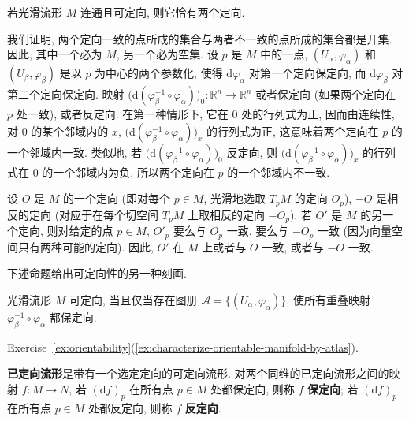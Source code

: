 \begin{RiemannProposition}\label{prop:two-orientations-on-connected-manifold}
若光滑流形 $M$ 连通且可定向, 则它恰有两个定向.
\end{RiemannProposition}

\begin{RiemannProof}
我们证明, 两个定向一致的点所成的集合与两者不一致的点所成的集合都是开集. 因此, 其中一个必为 $M$, 另一个必为空集. 设 $p$ 是 $M$ 中的一点, $(U_\alpha,\varphi_\alpha)$ 和 $(U_\beta,\varphi_\beta)$ 是以 $p$ 为中心的两个参数化, 使得 $\mathrm{d}\varphi_\alpha$ 对第一个定向保定向, 而 $\mathrm{d}\varphi_\beta$ 对第二个定向保定向. 映射 $\bigl(\mathrm{d}(\varphi_\beta^{-1}\circ\varphi_\alpha)\bigr)_0:\mathbb{R}^n\to\mathbb{R}^n$ 或者保定向 (如果两个定向在 $p$ 处一致), 或者反定向. 在第一种情形下, 它在 $0$ 处的行列式为正, 因而由连续性, 对 $0$ 的某个邻域内的 $x$, $\bigl(\mathrm{d}(\varphi_\beta^{-1}\circ\varphi_\alpha)\bigr)_x$ 的行列式为正, 这意味着两个定向在 $p$ 的一个邻域内一致. 类似地, 若 $\bigl(\mathrm{d}(\varphi_\beta^{-1}\circ\varphi_\alpha)\bigr)_0$ 反定向, 则 $\bigl(\mathrm{d}(\varphi_\beta^{-1}\circ\varphi_\alpha)\bigr)_x$ 的行列式在 $0$ 的一个邻域内为负, 所以两个定向在 $p$ 的一个邻域内不一致.

设 $O$ 是 $M$ 的一个定向 (即对每个 $p\in M$, 光滑地选取 $T_pM$ 的定向 $O_p$), $-O$ 是相反的定向 (对应于在每个切空间 $T_pM$ 上取相反的定向 $-O_p$). 若 $O'$ 是 $M$ 的另一个定向, 则对给定的点 $p\in M$, $O'_p$ 要么与 $O_p$ 一致, 要么与 $-O_p$ 一致 (因为向量空间只有两种可能的定向). 因此, $O'$ 在 $M$ 上或者与 $O$ 一致, 或者与 $-O$ 一致.
\end{RiemannProof}

下述命题给出可定向性的另一种刻画.

\begin{RiemannProposition}\label{prop:orientation-preserving-atlas}
光滑流形 $M$ 可定向, 当且仅当存在图册 $\mathcal{A}=\{(U_\alpha,\varphi_\alpha)\}$, 使所有重叠映射 $\varphi_\beta^{-1}\circ\varphi_\alpha$ 都保定向.
\end{RiemannProposition}

\begin{RiemannProof}
Exercise~\ref{ex:orientability}(\ref{ex:characterize-orientable-manifold-by-atlas}).
\end{RiemannProof}

\textbf{已定向流形}是带有一个选定定向的可定向流形. 对两个同维的已定向流形之间的映射 $f:M\to N$, 若 $(\mathrm{d}f)_p$ 在所有点 $p\in M$ 处都保定向, 则称 $f$ \textbf{保定向}; 若 $(\mathrm{d}f)_p$ 在所有点 $p\in M$ 处都反定向, 则称 $f$ \textbf{反定向}.

